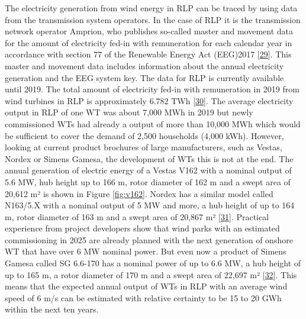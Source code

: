 \documentclass[a4paper,11pt]{article}
\begin{document}
The electricity generation from wind energy in RLP can be traced by using data from the transmission system operators. In the case of RLP it is the transmission network operator Amprion, who publishes so-called master and movement data for the amount of electricity fed-in with remuneration for each calendar year in accordance with section 77 of the Renewable Energy Act (EEG)2017 {[}\protect\hyperlink{ref-Bundesgestzblatt.2017}{29}{]}. This master and movement data includes information about the annual electricity generation and the EEG system key. The data for RLP is currently available until 2019. The total amount of electricity fed-in with remuneration in 2019 from wind turbines in RLP is approximately 6.782 TWh {[}\protect\hyperlink{ref-EnergieagenturRheinlandPfalz.2019}{30}{]}. The average electricity output in RLP of one WT was about 7,000 MWh in 2019 but newly commissioned WTs had already a output of more than 10,000 MWh which would be sufficient to cover the demand of 2,500 households (4,000 kWh). However, looking at current product brochures of large manufacturers, such as Vestas, Nordex or Simens Gamesa, the development of WTs this is not at the end. The annual generation of electric energy of a Vestas V162 with a nominal output of 5.6 MW, hub height up to 166 m, rotor diameter of 162 m and a swept area of 20,612 m² is shown in Figure \ref{fig:v162}. Nordex has a similar model called N163/5.X with a nominal output of 5 MW and more, a hub height of up to 164 m, rotor diameter of 163 m and a swept area of 20,867 m² {[}\protect\hyperlink{ref-Nordex.2021}{31}{]}. Practical experience from project developers show that wind parks with an estimated commissioning in 2025 are already planned with the next generation of onshore WT that have over 6 MW nominal power. But even now a product of Simens Gamesa called SG 6.6-170 has a nominal power of up to 6.6 MW, a hub height of up to 165 m, a rotor diameter of 170 m and a swept area of 22,697 m² {[}\protect\hyperlink{ref-SimensGamesa.2021}{32}{]}. This means that the expected annual output of WTs in RLP with an average wind speed of 6 m/s can be estimated with relative certainty to be 15 to 20 GWh within the next ten years.
\end{document}
